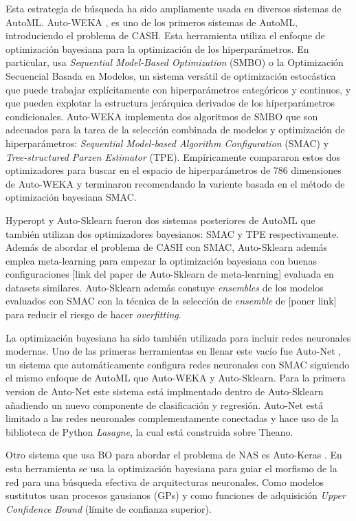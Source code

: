 Esta estrategia de búsqueda ha sido ampliamente usada en diversos sistemas de AutoML. Auto-WEKA \cite{thornton2013auto}, es uno de los primeros sistemas de AutoML, introduciendo el problema de CASH. Esta herramienta utiliza el enfoque de optimización bayesiana para la optimización de los hiperparámetros. En particular, usa \textit{Sequential Model-Based Optimization} (SMBO) o la Optimización Secuencial Basada en Modelos, un sistema versátil de optimización estocástica que puede trabajar explícitamente con hiperparámetros categóricos y continuos, y que pueden explotar la estructura jerárquica derivados de los hiperparámetros condicionales. Auto-WEKA implementa dos algoritmos de SMBO que son adecuados para la tarea de la selección combinada de modelos y optimización de hiperparámetros: \textit{Sequential Model-based Algorithm Configuration} (SMAC) y \textit{Tree-structured Parzen Estimator} (TPE). Empíricamente compararon estos dos optimizadores para buscar en el espacio de hiperparámetros de 786 dimensiones de Auto-WEKA y terminaron recomendando la variente basada en el método de optimización bayesiana SMAC.

Hyperopt \cite{bergstra2013hyperopt} y Auto-Sklearn \cite{fuerer2015efficient} fueron dos sistemas posteriores de AutoML que también utilizan dos optimizadores bayesianos: SMAC y TPE respectivamente. Además de abordar el problema de CASH con SMAC, Auto-Sklearn además emplea meta-learning para empezar la optimización bayesiana con buenas configuraciones [link del paper de Auto-Sklearn de meta-learning] evaluada en datasets similares. Auto-Sklearn además constuye \textit{ensembles} de los modelos evaluados con SMAC con la técnica de la selección de \textit{ensemble} de [poner link] para reducir el riesgo de hacer \textit{overfitting}. 

La optimización bayesiana ha sido también utilizada para incluir redes neuronales modernas. Uno de las primeras herramientas en llenar este vacío fue Auto-Net \cite{mendoza2016towards}, un sistema que automáticamente configura redes neuronales con SMAC siguiendo el mismo enfoque de AutoML que Auto-WEKA y Auto-Sklearn. Para la primera version de Auto-Net este sistema está implmentado dentro de Auto-Sklearn añadiendo un nuevo componente de clasificación y regresión. Auto-Net está limitado a las redes neuronales complementamente conectadas y hace uso de la biblioteca de Python \textit{Lasagne}, la cual está construida sobre Theano.


Otro sistema que usa BO para abordar el problema de NAS es Auto-Keras \cite{jin2019auto}. En esta herramienta se usa la optimización bayesiana para guiar el morfismo de la red para una búsqueda efectiva de arquitecturas neuronales. Como modelos sustitutos usan procesos gausianos (GPs) y como funciones de adquisición \textit{Upper Confidence Bound} (límite de confianza superior).

